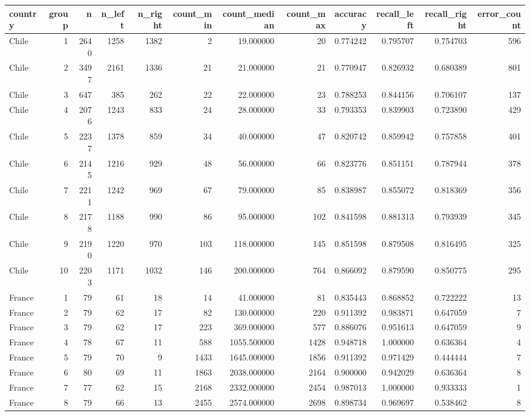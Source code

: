 \begin{tabular}{lrrrrrrrrrrr}
\toprule
country & group & n & n_left & n_right & count_min & count_median & count_max & accuracy & recall_left & recall_right & error_count \\
\midrule
Chile & 1 & 2640 & 1258 & 1382 & 2 & 19.000000 & 20 & 0.774242 & 0.795707 & 0.754703 & 596 \\
Chile & 2 & 3497 & 2161 & 1336 & 21 & 21.000000 & 21 & 0.770947 & 0.826932 & 0.680389 & 801 \\
Chile & 3 & 647 & 385 & 262 & 22 & 22.000000 & 23 & 0.788253 & 0.844156 & 0.706107 & 137 \\
Chile & 4 & 2076 & 1243 & 833 & 24 & 28.000000 & 33 & 0.793353 & 0.839903 & 0.723890 & 429 \\
Chile & 5 & 2237 & 1378 & 859 & 34 & 40.000000 & 47 & 0.820742 & 0.859942 & 0.757858 & 401 \\
Chile & 6 & 2145 & 1216 & 929 & 48 & 56.000000 & 66 & 0.823776 & 0.851151 & 0.787944 & 378 \\
Chile & 7 & 2211 & 1242 & 969 & 67 & 79.000000 & 85 & 0.838987 & 0.855072 & 0.818369 & 356 \\
Chile & 8 & 2178 & 1188 & 990 & 86 & 95.000000 & 102 & 0.841598 & 0.881313 & 0.793939 & 345 \\
Chile & 9 & 2190 & 1220 & 970 & 103 & 118.000000 & 145 & 0.851598 & 0.879508 & 0.816495 & 325 \\
Chile & 10 & 2203 & 1171 & 1032 & 146 & 200.000000 & 764 & 0.866092 & 0.879590 & 0.850775 & 295 \\
France & 1 & 79 & 61 & 18 & 14 & 41.000000 & 81 & 0.835443 & 0.868852 & 0.722222 & 13 \\
France & 2 & 79 & 62 & 17 & 82 & 130.000000 & 220 & 0.911392 & 0.983871 & 0.647059 & 7 \\
France & 3 & 79 & 62 & 17 & 223 & 369.000000 & 577 & 0.886076 & 0.951613 & 0.647059 & 9 \\
France & 4 & 78 & 67 & 11 & 588 & 1055.500000 & 1428 & 0.948718 & 1.000000 & 0.636364 & 4 \\
France & 5 & 79 & 70 & 9 & 1433 & 1645.000000 & 1856 & 0.911392 & 0.971429 & 0.444444 & 7 \\
France & 6 & 80 & 69 & 11 & 1863 & 2038.000000 & 2164 & 0.900000 & 0.942029 & 0.636364 & 8 \\
France & 7 & 77 & 62 & 15 & 2168 & 2332.000000 & 2454 & 0.987013 & 1.000000 & 0.933333 & 1 \\
France & 8 & 79 & 66 & 13 & 2455 & 2574.000000 & 2698 & 0.898734 & 0.969697 & 0.538462 & 8 \\

\end{tabular}
